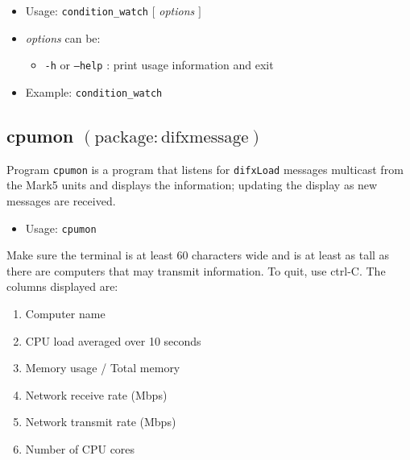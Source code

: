 \begin{itemize}
\item[] Usage: {\tt condition\_watch} $[$ {\em options} $]$
\item[] {\em options} can be:
\begin{itemize}
\item[] {\tt -h} or {\tt --help} : print usage information and exit
\end{itemize}
\item[] Example: {\tt condition\_watch}
\end{itemize}









\subsection{cpumon {\small $\mathrm{(package: difxmessage)}$}} \label{sec:cpumon} 

Program {\tt cpumon} is a program that listens for {\tt difxLoad} messages multicast from the Mark5 units and displays the information; updating the display as new messages are received.

\begin{itemize}
\item[] Usage: {\tt cpumon}
\end{itemize}

\noindent
Make sure the terminal is at least 60 characters wide and is at least as tall as there are computers that may transmit information.
To quit, use ctrl-C.
The columns displayed are:
\begin{enumerate}
\item Computer name
\item CPU load averaged over 10 seconds
\item Memory usage / Total memory
\item Network receive rate (Mbps)
\item Network transmit rate (Mbps)
\item Number of CPU cores
\end{enumerate}










